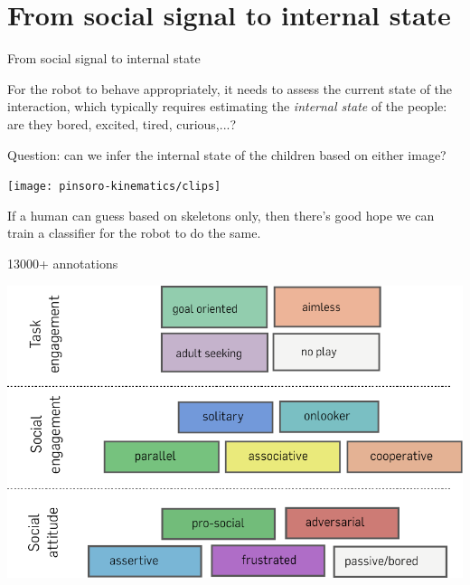 \documentclass[compress]{beamer}
\begin{document}
\section[Internal state estimation]{From social signal to internal state}

\begin{frame}{From social signal to internal state}

    For the robot to behave appropriately, it needs to assess the current state
    of the interaction, which typically requires estimating the \emph{internal
    state} of the people: are they bored, excited, tired, curious,...?

    \pause

    Question: can we infer the internal state of the children based on either
    image?

    \begin{center}
        \texttt{[image: pinsoro-kinematics/clips]}
    \end{center}

    If a human can guess based on skeletons only, then there's good hope we can
    train a classifier for the robot to do the same.

\end{frame}

{
\begin{frame}{13000+ annotations}
    \begin{center}
        \includegraphics[width=0.8\linewidth]{pinsoro-kinematics/coding-scheme}
    \end{center}
\end{frame}
}
\end{document}
